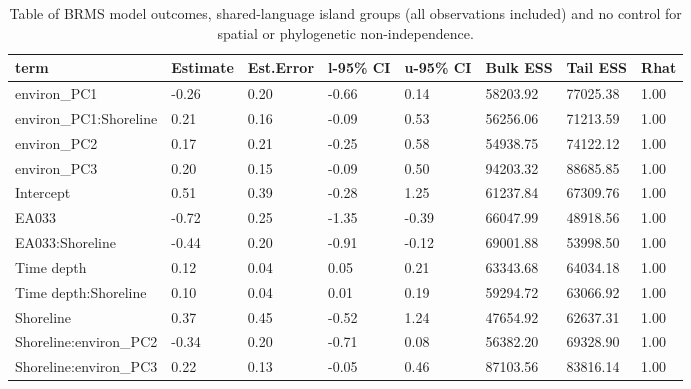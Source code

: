 \begin{table}[ht]
\centering
\begin{tabular}{p{3cm}p{1.35cm}p{1.35cm}p{1.35cm}p{1.35cm}p{1.35cm}p{1.35cm}p{1.35cm}}
  \toprule
term & Estimate & Est.Error & l-95\% CI & u-95\% CI & Bulk ESS & Tail ESS & Rhat \\ 
  \midrule
environ\_PC1 & -0.26 & 0.20 & -0.66 & 0.14 & 58203.92 & 77025.38 & 1.00 \\ 
  environ\_PC1:Shoreline & 0.21 & 0.16 & -0.09 & 0.53 & 56256.06 & 71213.59 & 1.00 \\ 
  environ\_PC2 & 0.17 & 0.21 & -0.25 & 0.58 & 54938.75 & 74122.12 & 1.00 \\ 
  environ\_PC3 & 0.20 & 0.15 & -0.09 & 0.50 & 94203.32 & 88685.85 & 1.00 \\ 
  Intercept & 0.51 & 0.39 & -0.28 & 1.25 & 61237.84 & 67309.76 & 1.00 \\ 
  EA033 & -0.72 & 0.25 & -1.35 & -0.39 & 66047.99 & 48918.56 & 1.00 \\ 
  EA033:Shoreline & -0.44 & 0.20 & -0.91 & -0.12 & 69001.88 & 53998.50 & 1.00 \\ 
  Time depth & 0.12 & 0.04 & 0.05 & 0.21 & 63343.68 & 64034.18 & 1.00 \\ 
  Time depth:Shoreline & 0.10 & 0.04 & 0.01 & 0.19 & 59294.72 & 63066.92 & 1.00 \\ 
  Shoreline & 0.37 & 0.45 & -0.52 & 1.24 & 47654.92 & 62637.31 & 1.00 \\ 
  Shoreline:environ\_PC2 & -0.34 & 0.20 & -0.71 & 0.08 & 56382.20 & 69328.90 & 1.00 \\ 
  Shoreline:environ\_PC3 & 0.22 & 0.13 & -0.05 & 0.46 & 87103.56 & 83816.14 & 1.00 \\ 
   \bottomrule
\end{tabular}
\caption{Table of BRMS model outcomes, shared-language island groups (all observations included) and no control for spatial or phylogenetic non-independence.} 
\label{BRMS_effects_medium_control_none}
\end{table}
